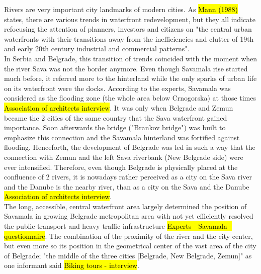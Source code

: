 \documentclass[11pt]{report}
\begin{document}
Rivers are very important city landmarks of modern cities. %
As \hl{Mann (1988)} states, there are various trends in waterfront redevelopment\footnotemark, but they all indicate refocusing the attention of planners, investors and citizens on "the central urban waterfronts with their transitions away from the inefficiencies and clutter of 19th and early 20th century industrial and commercial patterns".
\\
In Serbia and Belgrade, this transition of trends coincided with the moment when the river Sava was not the border anymore.\footnotemark
Even though Savamala rise started much before, it referred more to the hinterland while the only sparks of urban life on its waterfront were the docks.
According to the experts, Savamala was considered as the flooding zone (the whole area below Crnogorska) at those times \hl{Association of architects interview}.
It was only when Belgrade and Zemun became the 2 cities of the same country that the Sava waterfront gained importance. Soon afterwards the bridge ("Brankov bridge") was built to emphasize this connection and the Savamala hinterland was fortified against flooding.
Henceforth, the development of Belgrade was led in such a way that the connection with Zemun and the left Sava riverbank (New Belgrade side) were ever intensified. Therefore, even though Belgrade is physically placed at the confluence of 2 rivers, it is nowadays rather perceived as a city on the Sava river and the Danube is the nearby river, than as a city on the Sava and the Danube \hl{Association of architects interview}.
\\
The long, accessible, central waterfront area largely determined the position of Savamala in growing Belgrade metropolitan area with not yet efficiently resolved the public transport and heavy traffic infrastructure \hl{Experts - Savamala - questionnaire}.
The combination of the proximity of the river and the city center, but even more so its position in the geometrical center of the vast area of the city of Belgrade; "the middle of the three cities [Belgrade, New Belgrade, Zemun]" as one informant said \hl{Biking tours - interview}.
\end{document}
